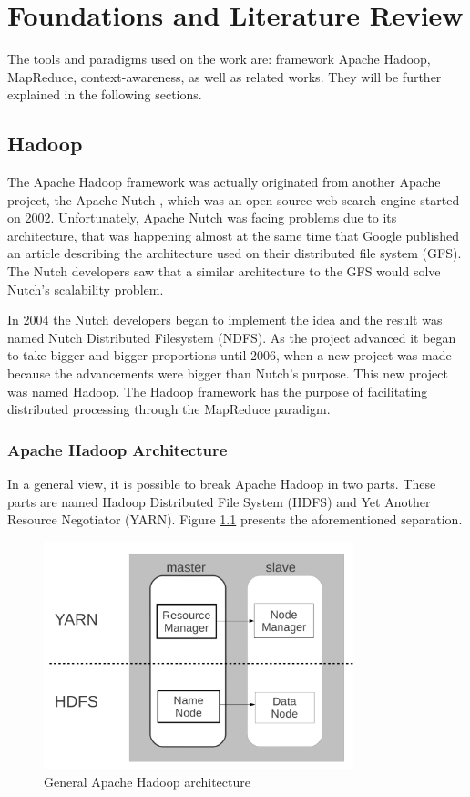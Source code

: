\chapter{Foundations and Literature Review}
\label{chap:fundamentacao}
The tools and paradigms used on the work are: framework Apache Hadoop, MapReduce, context-awareness, as well as related works. They will be further explained in the following sections.


\section{Hadoop}
The Apache Hadoop framework was actually originated from another Apache \cite{Apache} project, the Apache Nutch \cite {Nutch}, which was an open source web search engine started on 2002. Unfortunately, Apache Nutch was facing problems due to its architecture, that was happening almost at the same time that Google published an article describing the architecture used on their distributed file system (GFS). The Nutch developers saw that a similar architecture to the GFS would solve Nutch's scalability problem.

In 2004 the Nutch developers began to implement the idea and the result was named Nutch Distributed Filesystem (NDFS). As the project advanced it began to take bigger and bigger proportions until 2006, when a new project was made because the advancements were bigger than Nutch's purpose. This new project was named Hadoop. The Hadoop framework has the purpose of facilitating distributed processing through the MapReduce paradigm.

\subsection{Apache Hadoop Architecture}
In a general view, it is possible to break Apache Hadoop in two parts. These parts are named Hadoop Distributed File System (HDFS) and Yet Another Resource Negotiator (YARN). Figure \ref{fig:ArqGeral} presents the aforementioned separation.

\begin{figure}[hbtn]
   \renewcommand{\figurename}{Figure}
   \centering
   \includegraphics[width=9cm]{figuras/Figura08-HadoooArchGeral.png}
   \caption{General Apache Hadoop architecture}
   \label{fig:ArqGeral}
\end{figure}

